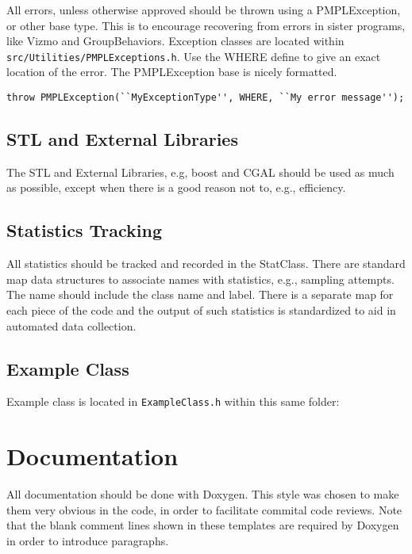 \documentclass[12pt]{article}
\begin{document}
All errors, unless otherwise approved should be thrown using a PMPLException, or
other base type. This is to encourage recovering from errors in sister programs,
like Vizmo and GroupBehaviors. Exception classes are located within
\texttt{src/Utilities/PMPLExceptions.h}. Use the WHERE define to give an exact
location of the error. The PMPLException base is nicely formatted.

\begin{lstlisting}
throw PMPLException(``MyExceptionType'', WHERE, ``My error message'');
\end{lstlisting}

\subsection{STL and External Libraries}

The STL and External Libraries, e.g, boost and CGAL should be used as much as
possible, except when there is a good reason not to, e.g., efficiency.

\subsection{Statistics Tracking}

All statistics should be tracked and recorded in the StatClass. There are
standard map data structures to associate names with statistics, e.g., sampling
attempts. The name should include the class name and label. There is a separate
map for each piece of the code and the output of such statistics is standardized
to aid in automated data collection.

\subsection{Example Class}
Example class is located in \texttt{ExampleClass.h} within this same folder:




\section{Documentation}
All documentation should be done with Doxygen. This style was chosen to make
them very obvious in the code, in order to facilitate commital code reviews.
Note that the blank comment lines shown in these templates are required by
Doxygen in order to introduce paragraphs.
\end{document}
